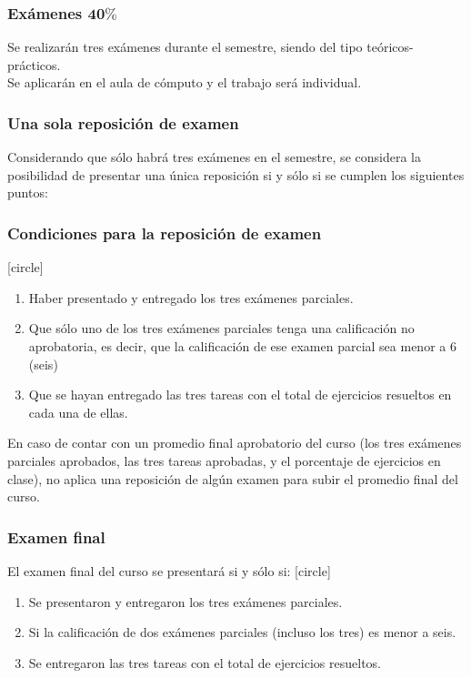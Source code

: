 \documentclass[12pt]{beamer}
\begin{document}
\begin{frame}
\frametitle{Exámenes $\mathbf{40\%}$}
Se realizarán tres exámenes durante el semestre, siendo del tipo teóricos-prácticos.
\\
\bigskip
Se aplicarán en el aula de cómputo y el trabajo será individual.
\end{frame}
\begin{frame}
\frametitle{Una sola reposición de examen}
Considerando que sólo habrá tres exámenes en el semestre, se considera la posibilidad de presentar una única reposición si y sólo si se cumplen los siguientes puntos:
\end{frame}
\begin{frame}
\frametitle{Condiciones para la reposición de examen}
[circle]
\begin{enumerate}[<+->]
\item Haber presentado y entregado los tres exámenes parciales.
\item Que sólo uno de los tres exámenes parciales tenga una calificación no aprobatoria, es decir, que la calificación de ese examen parcial sea menor a 6 (seis)
\item Que se hayan entregado las tres tareas con el total de ejercicios resueltos en cada una de ellas.
\end{enumerate}
\end{frame}
\begin{frame}
En caso de contar con un promedio final aprobatorio del curso (los tres exámenes parciales aprobados, las tres tareas aprobadas, y el porcentaje de ejercicios en clase), \alert{no aplica una reposición de algún examen} para subir el promedio final del curso.
\end{frame}
\begin{frame}
\frametitle{Examen final}
El examen final del curso se presentará si y sólo si:
[circle]
\begin{enumerate}[<+->]
\item Se presentaron y entregaron los tres exámenes parciales.
\item Si la calificación de dos exámenes parciales (incluso los tres) es menor a seis.
\item Se entregaron las tres tareas con el total de ejercicios resueltos.
\end{enumerate}
\end{frame}
\end{document}
